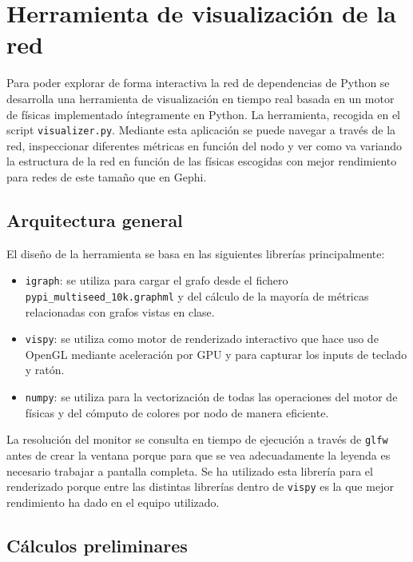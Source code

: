 \documentclass[12pt,a4paper]{report}
\begin{document}
	\chapter{Herramienta de visualización de la red}
	
	Para poder explorar de forma interactiva la red de dependencias de Python se desarrolla una herramienta de visualización en tiempo real basada en un motor de físicas implementado íntegramente en Python. La herramienta, recogida en el script \texttt{visualizer.py}. Mediante esta aplicación se puede navegar a través de la red, inspeccionar diferentes métricas en función del nodo y ver como va variando la estructura de la red en función de las físicas escogidas con mejor rendimiento para redes de este tamaño que en Gephi.
	
	\section{Arquitectura general}

	
	El diseño de la herramienta se basa en las siguientes librerías principalmente:
	
	\begin{itemize}
		\item \texttt{igraph}: se utiliza para cargar el grafo desde el fichero \texttt{pypi\_multiseed\_10k.graphml} y del cálculo de la mayoría de métricas relacionadas con grafos vistas en clase.
		\item \texttt{vispy}: se utiliza como motor de renderizado interactivo que hace uso de OpenGL mediante aceleración por GPU y para capturar los inputs de teclado y ratón.
		\item \texttt{numpy}: se utiliza para la vectorización de todas las operaciones del motor de físicas y del cómputo de colores por nodo de manera eficiente.
	\end{itemize}
	
	La resolución del monitor se consulta en tiempo de ejecución a través de \texttt{glfw} antes de crear la ventana porque para que se vea adecuadamente la leyenda es necesario trabajar a pantalla completa. Se ha utilizado esta librería para el renderizado porque entre las distintas librerías dentro de \texttt{vispy} es la que mejor rendimiento ha dado en el equipo utilizado.
	
	\section{Cálculos preliminares}
	
\end{document}
